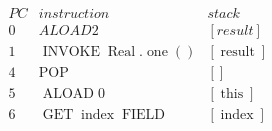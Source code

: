\documentclass{article}
\newcommand{\tmop}[1]{\ensuremath{\operatorname{#1}}}
\begin{document}
$\begin{array}{lll}
  PC & instruction & stack\\
  0 & ALOAD 2 & [result]\\
  1 & \tmop{INVOKE} \tmop{Real} . \tmop{one} () & [\tmop{result}]\\
  4 & \tmop{POP} & []\\
  5 & \tmop{ALOAD} 0 & [\tmop{this}]\\
  6 & \tmop{GET} \tmop{index} \tmop{FIELD} & [\tmop{index}]
\end{array}$
\end{document}
